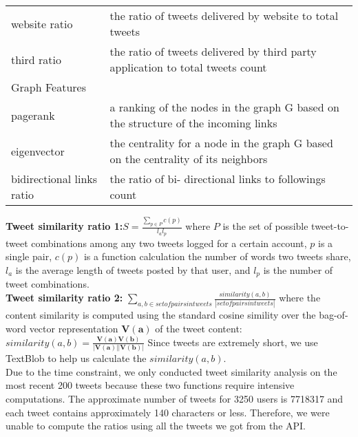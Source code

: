 \documentclass[a4paper, 12pt]{report}
\begin{document}
\begin{table}[h!]
\begin{center}
\begin{tabular}{p{4.5cm} | p{11cm}}
			website ratio & the ratio of tweets delivered by website to total tweets \\
			third ratio & the ratio of tweets delivered by third party application to total tweets count \\
			\hline
			\multicolumn{2}{|l|}{Graph Features} \\
			\hline
			pagerank & a ranking of the nodes in the graph G based on the structure of the incoming links\\
			eigenvector & the centrality for a node in the graph G based on the centrality of its neighbors \\
			bidirectional links ratio & the ratio of bi- directional links to followings count \\
			\hline
		\end{tabular}
	\end{center}
\end{table}

\noindent\textbf{Tweet similarity ratio 1:}$S=\frac{\sum_{p\in P}c(p)}{l_al_p}$ where $P$ is the set of possible tweet-to-tweet combinations among any two tweets logged for a certain account, $p$ is a single pair, $c(p)$ is a function calculation the number of words two tweets share, $l_a$ is the average length of tweets posted by that user, and $l_p$ is the number of tweet combinations. \\

\noindent\textbf{Tweet similarity ratio 2:} $\sum_{a,b \in set of pairs in tweets}\frac{similarity(a,b)}{|set of pairs in tweets|}$ where the content similarity is computed using the standard cosine simility over the bag-of-word vector representation $\mathbf{V(a)}$ of the tweet content: $similarity(a,b)=\frac{\mathbf{V(a)}\mathbf{V(b)}}{|\mathbf{V(a)}||\mathbf{V(b)}|}$ Since tweets are extremely short, we use TextBlob to help us calculate the $similarity(a,b)$. \\

\noindent Due to the time constraint, we only conducted tweet similarity analysis on the most recent 200 tweets because these two functions require intensive computations. The approximate number of tweets for 3250 users is 7718317 and each tweet contains approximately 140 characters or less. Therefore, we were unable to compute the ratios using all the tweets we got from the API. 
\end{document}
